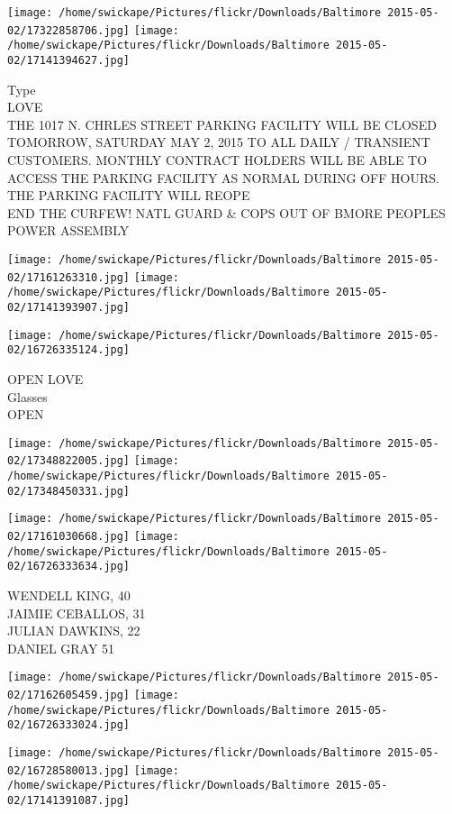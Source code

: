 \documentclass[10pt,letterpaper]{article}
\begin{document}
\texttt{[image: /home/swickape/Pictures/flickr/Downloads/Baltimore 2015-05-02/17322858706.jpg]}
\texttt{[image: /home/swickape/Pictures/flickr/Downloads/Baltimore 2015-05-02/17141394627.jpg]}

Type\\
LOVE\\
THE 1017 N. CHRLES STREET PARKING FACILITY WILL BE CLOSED TOMORROW, SATURDAY MAY 2, 2015 TO ALL DAILY / TRANSIENT CUSTOMERS.  MONTHLY CONTRACT HOLDERS WILL BE ABLE TO ACCESS THE PARKING FACILITY AS NORMAL DURING OFF HOURS.  THE PARKING FACILITY WILL REOPE\\
END THE CURFEW!  NATL GUARD \& COPS OUT OF BMORE PEOPLES POWER ASSEMBLY\\
\pagebreak

\texttt{[image: /home/swickape/Pictures/flickr/Downloads/Baltimore 2015-05-02/17161263310.jpg]}
\texttt{[image: /home/swickape/Pictures/flickr/Downloads/Baltimore 2015-05-02/17141393907.jpg]}

\vspace{0.25in}
\texttt{[image: /home/swickape/Pictures/flickr/Downloads/Baltimore 2015-05-02/16726335124.jpg]}

OPEN LOVE\\
Glasses\\
OPEN\\
\pagebreak

\texttt{[image: /home/swickape/Pictures/flickr/Downloads/Baltimore 2015-05-02/17348822005.jpg]}
\texttt{[image: /home/swickape/Pictures/flickr/Downloads/Baltimore 2015-05-02/17348450331.jpg]}

\texttt{[image: /home/swickape/Pictures/flickr/Downloads/Baltimore 2015-05-02/17161030668.jpg]}
\texttt{[image: /home/swickape/Pictures/flickr/Downloads/Baltimore 2015-05-02/16726333634.jpg]}

WENDELL KING, 40\\
JAIMIE CEBALLOS, 31\\
JULIAN DAWKINS, 22\\
DANIEL GRAY 51\\
\pagebreak

\texttt{[image: /home/swickape/Pictures/flickr/Downloads/Baltimore 2015-05-02/17162605459.jpg]}
\texttt{[image: /home/swickape/Pictures/flickr/Downloads/Baltimore 2015-05-02/16726333024.jpg]}

\texttt{[image: /home/swickape/Pictures/flickr/Downloads/Baltimore 2015-05-02/16728580013.jpg]}
\texttt{[image: /home/swickape/Pictures/flickr/Downloads/Baltimore 2015-05-02/17141391087.jpg]}
\end{document}
